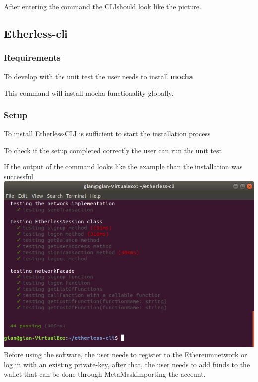 After entering the command the CLI\glo should look like the picture.

\subsection{Etherless-cli}
\subsubsection{Requirements}
To develop with the unit test the user needs to install \textbf{mocha}
\begin{center}
\end{center}
This command will install mocha functionality globally.

\subsubsection{Setup}
To install Etherless-CLI is sufficient to start the installation process
\begin{center}
\end{center} 

To check if the setup completed correctly the user can run the unit test
\begin{center}
\end{center}

If the output of the command looks like the example than the installation was successful
\includegraphics[width=\textwidth]{res/img/npmruntest.png}
Before using the software, the user needs to register to the Ethereum\glo network or log in with an existing private-key\glo, after that, the user needs to add funds to the wallet that can be done through MetaMask\glo importing the account.
